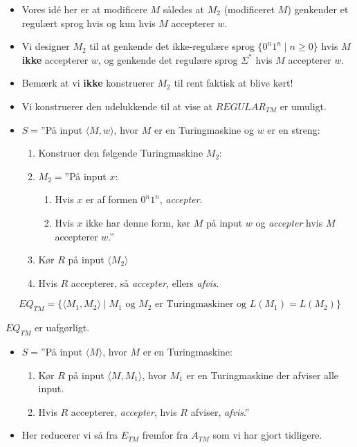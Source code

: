 \begin{frame}[allowframebreaks]
	\begin{itemize}
		\item Vores idé her er at modificere $M$ således at $M_{2}$ (modificeret $M$) genkender et regulært sprog hvis og kun hvis $M$ accepterer $w$.
		\item Vi designer $M_{2}$ til at genkende det ikke-regulære sprog $\{0^{n}1^{n} \mid n \ge 0\}$ hvis $M$ \textbf{ikke} accepterer $w$, og genkende det regulære sprog $\Sigma^{*}$ hvis $M$ accepterer $w$.
		\item Bemærk at vi \textbf{ikke} konstruerer $M_{2}$ til rent faktisk at blive kørt!
		\item Vi konstruerer den udelukkende til at vise at $REGULAR_{TM}$ er umuligt.
		\item $S = $''På input \(\langle M, w \rangle\), hvor $M$ er en Turingmaskine og $w$ er en streng:
		      \begin{enumerate}
			      \item Konstruer den følgende Turingmaskine $M_{2}$:
			      \item[  ] $M_{2} =$''På input $x$:
			            \begin{enumerate}
				            \item Hvis $x$ er af formen $0^{n}1^{n}$, \textit{accepter}.
				            \item Hvis $x$ ikke har denne form, kør $M$ på input $w$  og \textit{accepter} hvis $M$ accepterer $w$.''
			            \end{enumerate}
			      \item Kør $R$ på input $\langle M_{2} \rangle $
			      \item Hvis $R$ accepterer, så \textit{accepter}, ellers \textit{afvis}.
		      \end{enumerate}
	\end{itemize}

	\begin{equation*}
		EQ_{TM} = \{\langle M_{1}, M_{2} \rangle \mid M_{1} \text{ og } M_{2} \text{ er Turingmaskiner og } L(M_{1}) = L(M_{2})\}
	\end{equation*}

	\begin{theorem}
		$EQ_{TM}$ er uafgørligt.
	\end{theorem}

	\begin{itemize}
		\item$S =$''På input \(\langle M \rangle \), hvor $M$ er en Turingmaskine:
		      \begin{enumerate}
			      \item Kør $R$ på input $\langle M, M_{1} \rangle$, hvor $M_{1}$ er en Turingmaskine der afviser alle input.
			      \item Hvis $R$ accepterer, \textit{accepter}, hvis $R$ afviser, \textit{afvis}.''
		      \end{enumerate}
		\item Her reducerer vi så fra $E_{TM}$ fremfor fra $A_{TM}$ som vi har gjort tidligere.
	\end{itemize}
\end{frame}



